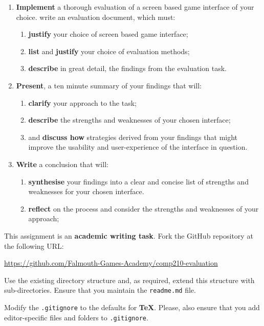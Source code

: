 \documentclass{../fal_assignment}
\begin{document}
\begin{enumerate}[label=(\alph*)]
    \item \textbf{Implement} a thorough evaluation of a screen based game interface of your choice. write an evaluation document, which must:
    	\begin{enumerate}[label=\roman*.]
    		\item \textbf{justify} your choice of screen based game interface;
    		\item \textbf{list} and \textbf{justify} your choice of evaluation methods;
		\item \textbf{describe} in great detail, the findings from the evaluation task.
	\end{enumerate}
    \item \textbf{Present}, a ten minute summary of your findings that will:
    	\begin{enumerate}[label=\roman*.]
    		\item \textbf{clarify} your approach to the task;
    		\item \textbf{describe} the strengths and weaknesses of your chosen interface;
    		\item and \textbf{discuss how} strategies derived from your findings that might improve the usability and user-experience of the interface in question.
	\end{enumerate}
	\item \textbf{Write} a conclusion that will:
    	\begin{enumerate}[label=\roman*.]
    		\item \textbf{synthesise} your findings into a clear and concise list of strengths and weaknesses for your chosen interface. 
    		\item \textbf{reflect} on the process and consider the strengths and weaknesses of your approach;
	\end{enumerate}
\end{enumerate}

This assignment is an \textbf{academic writing task}. Fork the GitHub repository at the following URL:

\indent \url{https://github.com/Falmouth-Games-Academy/comp210-evaluation}

Use the existing directory structure and, as required, extend this structure with sub-directories. Ensure that you maintain the \texttt{readme.md} file.

Modify the \texttt{.gitignore} to the defaults for \textbf{TeX}. Please, also ensure that you add editor-specific files and folders to \texttt{.gitignore}. 
\end{document}
